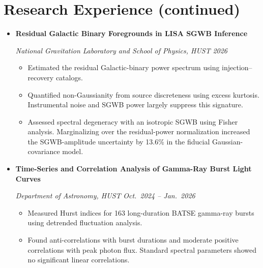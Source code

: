 \documentclass[letterpaper,11pt]{article}
\newlength{\cvEntryGap}
\newenvironment{cvEntries}{%
    \begin{itemize}[
        label={},
        leftmargin=0.15in,
        rightmargin=0pt,
        topsep=0pt,
        partopsep=0pt,
        parsep=0pt,
        itemsep=\cvEntryGap
    ]
}{%
    \end{itemize}
}
\newenvironment{cvBullets}{%
    \begin{itemize}[
        label=\textbullet,
        leftmargin=1.65em,
        topsep=2pt,
        partopsep=0pt,
        parsep=0pt,
        itemsep=2.5pt
    ]
    \small
}{%
    \end{itemize}
}
\newcommand{\cvOrg}[1]{%
    {\small\itshape #1}%
}
\newcommand{\researchEntry}[3]{%
    \item
    \needspace{5\baselineskip}
    \textbf{#1}\par
    \cvOrg{#2}\hfill{\small\itshape #3}\par
}
\begin{document}

\newpage

\section*{Research Experience (continued)}

\begin{cvEntries}


    \researchEntry
    {Residual Galactic Binary Foregrounds
    in LISA SGWB Inference}
    {National Gravitation Laboratory and
    School of Physics, HUST}
    {2026}

    \begin{cvBullets}

        \item
        Estimated the residual Galactic-binary
        power spectrum using injection--recovery
        catalogs.

        \item
        Quantified non-Gaussianity from source
        discreteness using excess kurtosis.
        Instrumental noise and SGWB power
        largely suppress this signature.

        \item
        Assessed spectral degeneracy with an
        isotropic SGWB using Fisher analysis.
        Marginalizing over the residual-power
        normalization increased the SGWB-amplitude
        uncertainty by 13.6\% in the fiducial
        Gaussian-covariance model.

    \end{cvBullets}


    \researchEntry
    {Time-Series and Correlation Analysis
    of Gamma-Ray Burst Light Curves}
    {Department of Astronomy, HUST}
    {Oct.\ 2024 -- Jan.\ 2026}

    \begin{cvBullets}

        \item
        Measured Hurst indices for 163
        long-duration BATSE gamma-ray bursts
        using detrended fluctuation analysis.

        \item
        Found anti-correlations with burst
        durations and moderate positive correlations
        with peak photon flux. Standard spectral
        parameters showed no significant
        linear correlations.


\end{cvBullets}
\end{cvEntries}
\end{document}
